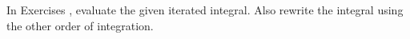 {\noindent In Exercises}
{, evaluate the given iterated integral. Also rewrite the integral using the other order of integration.}
